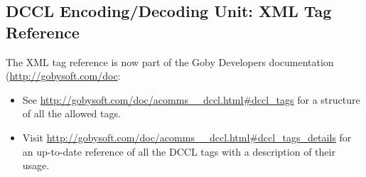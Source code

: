 \subsection{DCCL Encoding/Decoding Unit: XML Tag Reference}

The XML tag reference is now part of the Goby Developers documentation (\url{http://gobysoft.com/doc}:
\begin{itemize}
\item See \url{http://gobysoft.com/doc/acomms__dccl.html#dccl_tags} for a structure of all the allowed tags.
\item Visit \url{http://gobysoft.com/doc/acomms__dccl.html#dccl_tags_details} for an up-to-date reference of all the DCCL tags with a description of their usage.
\end{itemize}  

